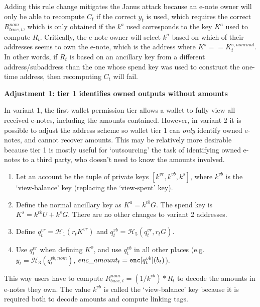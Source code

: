 Adding this rule change mitigates the Janus attack because an e-note owner will only be able to recompute $C_t$ if the correct $y_t$ is used, which requires the correct $R^{nom}_{base,t}$, which is only obtained if the $k^a$ used corresponds to the key $K^a$ used to compute $R_t$. Critically, the e-note owner will select $k^a$ based on which of their addresses seems to own the e-note, which is the address where $K^s == K^{s,nominal}_t$. In other words, if $R_t$ is based on an ancillary key from a different address/subaddress than the one whose spend key was used to construct the one-time address, then recomputing $C_t$ will fail.

\textbf{Adjustment 1: tier 1 identifies owned outputs without amounts}

In variant 1, the first wallet permission tier allows a wallet to fully view all received e-notes, including the amounts contained. However, in variant 2 it is possible to adjust the address scheme so wallet tier 1 can {\em only} identify owned e-notes, and cannot recover amounts. This may be relatively more desirable because tier 1 is mostly useful for `outsourcing' the task of identifying owned e-notes to a third party, who doesn't need to know the amounts involved.

\begin{enumerate}
    \item Let an account be the tuple of private keys $[k^{vr}, k^{vb}, k^s]$, where $k^{vb}$ is the `view-balance' key (replacing the `view-spent' key).

    \item Define the normal ancillary key as $K^a = k^{vb} G$. The spend key is $K^s = k^{vb} U + k^s G$. There are no other changes to variant 2 addresses.

    \item Define $q^{vr}_t = \mathcal{H}_1(r_t K^{vr})$ and $q^{vb}_t = \mathcal{H}_5(q^{vr}_t, r_t G)$.

    \item Use $q^{vr}_t$ when defining $K^o$, and use $q^{vb}_t$ in all other places (e.g.\ $y_t = \mathcal{H}_3(q^{vb,nom}_t)$, $enc\_amount_t = \textrm{\tt enc}[q^{vb}_t](b_t)$).
\end{enumerate}

This way users have to compute $R^{nom}_{base,t} = (1/k^{vb})*R_t$ to decode the amounts in e-notes they own. The value $k^{vb}$ is called the `view-balance' key because it is required both to decode amounts and compute linking tags.

